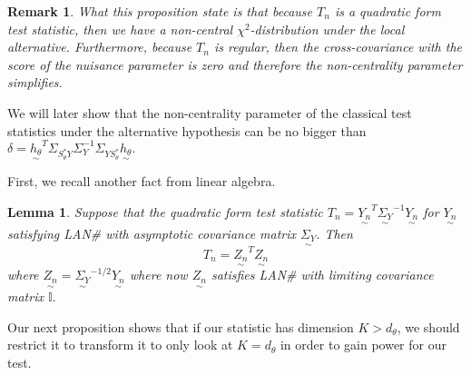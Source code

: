 \documentclass[twoside]{article}
\newtheorem{lemma}[theorem]{Lemma}
\newtheorem{remark}[theorem]{Remark}
\newcommand{\utilde}{\underset{\sim}}
\begin{document}
\begin{remark}What this proposition state is that because $T_n$ is a quadratic form test statistic, then we have a non-central $\chi^2$-distribution under the local alternative. Furthermore, because $T_n$ is regular, then the cross-covariance with the score of the nuisance parameter is zero and therefore the non-centrality parameter simplifies.
\end{remark}

We will later show that the non-centrality parameter of the classical test statistics under the alternative hypothesis can be no bigger than $\delta = \utilde{h_{\theta}}^T\Sigma_{S_{\theta}^{*}Y}\Sigma_{Y}^{-1}\Sigma_{YS_{\theta}^{*}}\utilde{h_{\theta}}.$

First, we recall another fact from linear algebra.
\begin{lemma}Suppose that the quadratic form test statistic $T_n = \utilde{Y_n}^{T}\utilde{\Sigma_Y}^{-1}\utilde{Y_n}$ for $\utilde{Y_n}$ satisfying LAN\# with asymptotic covariance matrix $\utilde{\Sigma_Y}.$ Then 
$$
T_n = \utilde{Z_n}^T\utilde{Z_n}
$$
where $\utilde{Z_n} = \utilde{\Sigma_Y}^{-1/2}\utilde{Y_n}$ where now $\utilde{Z_n}$ satisfies LAN\# with limiting covariance matrix $\mathbb{I}.$
\end{lemma}

Our next proposition shows that if our statistic has dimension $K > d_{\theta}$, we should restrict it to transform it to only look at $K = d_{\theta}$ in order to gain power for our test.
\end{document}
